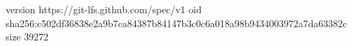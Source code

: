 version https://git-lfs.github.com/spec/v1
oid sha256:c502df36838e2a9b7ca84387b84147b3c0c6a018a98b9434003972a7da63382c
size 39272
